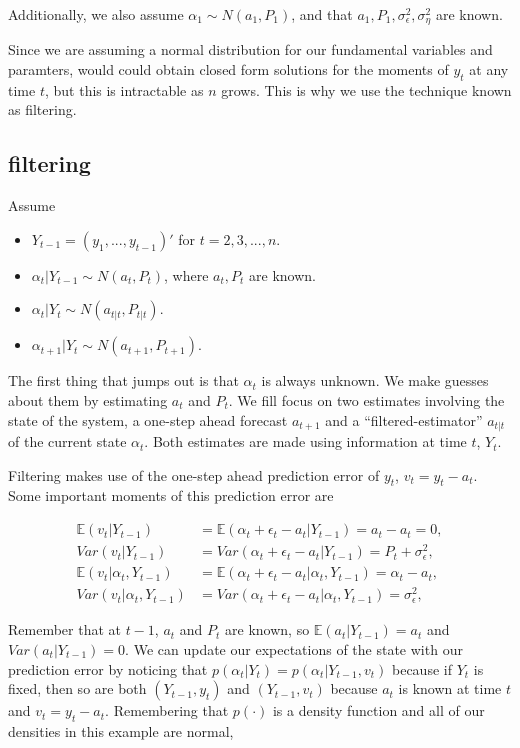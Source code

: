 \documentclass{tufte-book}
\begin{document}
Additionally, we also assume $\alpha_1 \sim N(a_1, P_1)$, and that $a_1, P_1, \sigma_\epsilon^2, \sigma_\eta^2$ are known.

Since we are assuming a normal distribution for our fundamental variables and paramters, would could obtain closed form solutions for the moments of $y_t$ at any time $t$, but this is intractable as $n$ grows. This is why we use the technique known as filtering.

\subsection{filtering}

Assume

\begin{itemize}
    \item $Y_{t-1} = (y_1, ..., y_{t-1})'$ for $t=2, 3, ..., n$.
    \item $\alpha_t | Y_{t-1} \sim N(a_t, P_t)$, where $a_t, P_t$ are known. 
    \item $\alpha_t | Y_t \sim N(a_{t|t}, P_{t|t})$.
    \item $\alpha_{t+1} | Y_t \sim N(a_{t+1}, P_{t+1})$. 
\end{itemize}

The first thing that jumps out is that $\alpha_t$ is always unknown. We make guesses about them by estimating $a_t$ and $P_t$. We fill focus on two estimates involving the state of the system, a one-step ahead forecast $a_{t+1}$ and a ``filtered-estimator'' $a_{t|t}$ of the current state $\alpha_t$. Both estimates are made using information at time $t$, $Y_t$.

Filtering makes use of the one-step ahead prediction error of $y_t$, $v_t = y_t - a_t$. Some important moments of this prediction error are

\begin{align*}
\mathbb{E}(v_t|Y_{t-1}) &= \mathbb{E} (\alpha_t + \epsilon_t - a_t | Y_{t-1}) = a_t - a_t = 0, \\
Var(v_t|Y_{t-1}) &= Var (\alpha_t + \epsilon_t - a_t | Y_{t-1}) = P_t + \sigma_\epsilon^2, \\
\mathbb{E}(v_t|\alpha_t, Y_{t-1}) &= \mathbb{E} (\alpha_t + \epsilon_t - a_t | \alpha_t, Y_{t-1}) = \alpha_t - a_t, \\
Var(v_t| \alpha_t, Y_{t-1}) &= Var (\alpha_t + \epsilon_t - a_t | \alpha_t, Y_{t-1}) = \sigma_\epsilon^2, 
\end{align*}

\noindent Remember that at $t-1$, $a_t$ and $P_t$ are known, so $\mathbb{E}(a_t | Y_{t-1}) = a_t$ and $Var(a_t | Y_{t-1}) = 0$. We can update our expectations of the state with our prediction error by noticing that $p(\alpha_t | Y_t) = p(\alpha_t | Y_{t-1}, v_t)$ because if $Y_t$ is fixed, then so are both $(Y_{t-1}, y_t)$ and $(Y_{t-1}, v_t)$ because $a_t$ is known at time $t$ and $v_t = y_t - a_t$. Remembering that $p(\cdot)$ is a density function and all of our densities in this example are normal, 
\end{document}
